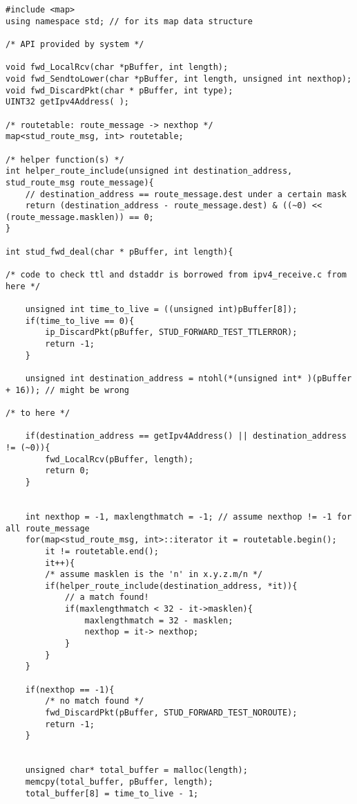 \documentclass{article}
\begin{document}
\begin{lstlisting}
#include <map>
using namespace std; // for its map data structure

/* API provided by system */

void fwd_LocalRcv(char *pBuffer, int length);
void fwd_SendtoLower(char *pBuffer, int length, unsigned int nexthop);
void fwd_DiscardPkt(char * pBuffer, int type);
UINT32 getIpv4Address( );

/* routetable: route_message -> nexthop */
map<stud_route_msg, int> routetable;

/* helper function(s) */
int helper_route_include(unsigned int destination_address, stud_route_msg route_message){
    // destination_address == route_message.dest under a certain mask
    return (destination_address - route_message.dest) & ((~0) << (route_message.masklen)) == 0;
}

int stud_fwd_deal(char * pBuffer, int length){

/* code to check ttl and dstaddr is borrowed from ipv4_receive.c from here */

    unsigned int time_to_live = ((unsigned int)pBuffer[8]);
    if(time_to_live == 0){
        ip_DiscardPkt(pBuffer, STUD_FORWARD_TEST_TTLERROR);
        return -1;
    }

    unsigned int destination_address = ntohl(*(unsigned int* )(pBuffer + 16)); // might be wrong

/* to here */

    if(destination_address == getIpv4Address() || destination_address != (~0)){
        fwd_LocalRcv(pBuffer, length);
        return 0;
    }


    int nexthop = -1, maxlengthmatch = -1; // assume nexthop != -1 for all route_message
    for(map<stud_route_msg, int>::iterator it = routetable.begin();
        it != routetable.end();
        it++){
        /* assume masklen is the 'n' in x.y.z.m/n */
        if(helper_route_include(destination_address, *it)){
            // a match found!
            if(maxlengthmatch < 32 - it->masklen){
                maxlengthmatch = 32 - masklen;
                nexthop = it-> nexthop;
            }
        }
    }

    if(nexthop == -1){
        /* no match found */
        fwd_DiscardPkt(pBuffer, STUD_FORWARD_TEST_NOROUTE);
        return -1;
    }


    unsigned char* total_buffer = malloc(length);
    memcpy(total_buffer, pBuffer, length);
    total_buffer[8] = time_to_live - 1;


\end{lstlisting}
\end{document}
